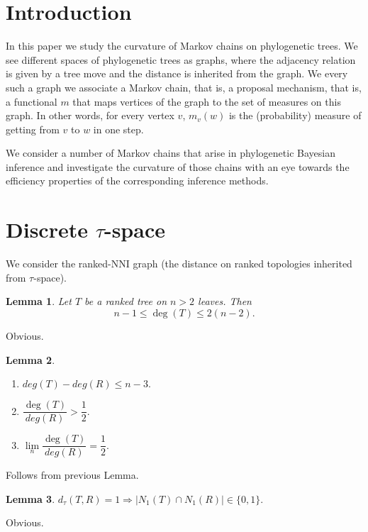 \documentclass{amsart}
\newtheorem{lemma}{Lemma}
\begin{document}
\section{Introduction}

In this paper we study the curvature of Markov chains on phylogenetic trees. 
We see different spaces of phylogenetic trees as graphs, where the adjacency 
relation is given by a tree move and the distance is inherited from the graph.
We every such a graph we associate a Markov chain, that is, a proposal 
mechanism, that is, a functional $m$ that maps vertices of the graph to the
set of measures on this graph. In other words, for every vertex $v$, $m_v(w)$
is the (probability) measure of getting from $v$ to $w$ in one step. 

We consider a number of Markov chains that arise in phylogenetic Bayesian 
inference and investigate the curvature of those chains with an eye towards 
the efficiency properties of the corresponding inference methods. 

\section{Discrete $\tau$-space}

We consider the ranked-NNI graph (the distance on ranked topologies inherited 
from $\tau$-space). 

\begin{lemma}
Let $T$ be a ranked tree on $n>2$ leaves. Then \[n-1\leq \deg(T)\leq2(n-2).\] 
\end{lemma}

\proof
Obvious. 
\endproof

\begin{lemma}
\begin{enumerate}[(1)]
\item $deg(T)-deg(R) \leq n-3.$
\item $\dfrac{\deg(T)}{deg(R)}>\dfrac12.$
\item $\lim\limits_n\dfrac{\deg(T)}{deg(R)}=\dfrac{1}{2}.$
\end{enumerate}
\end{lemma}

\proof
Follows from previous Lemma. 
\endproof

\begin{lemma}
$d_{\tau}(T,R) = 1 \Rightarrow |N_1(T)\cap N_1(R)|\in\{0,1\}.$
\end{lemma}

\proof
Obvious.
\endproof
\end{document}

